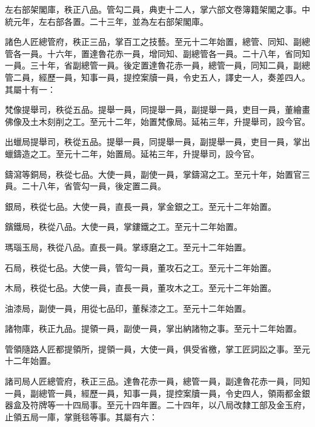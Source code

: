 \begin{pinyinscope}
 左右部架閣庫，秩正八品。管勾二員，典吏十二人，掌六部文卷簿籍架閣之事。中統元年，左右部各置。二十三年，並為左右部架閣庫。



 諸色人匠總管府，秩正三品，掌百工之技藝。至元十二年始置，總管、同知、副總管各一員。十六年，置達魯花赤一員，增同知、副總管各一員。二十八年，省同知一員。三十年，省副總管一員。後定置達魯花赤一員，總管一員，同知二員，副總管二員，經歷一員，知事一員，提控案牘一員，令史五人，譯史一人，奏差四人。其屬十有一：



 梵像提舉司，秩從五品。提舉一員，同提舉一員，副提舉一員，吏目一員，董繪畫佛像及土木刻削之工。至元十二年，始置梵像局。延祐三年，升提舉司，設今官。



 出蠟局提舉司，秩從五品。提舉一員，同提舉一員，副提舉一員，吏目一員，掌出蠟鑄造之工。至元十二年，始置局。延祐三年，升提舉司，設今官。



 鑄瀉等銅局，秩從七品。大使一員，副使一員，掌鑄瀉之工。至元十年，始置官三員。二十八年，省管勾一員，後定置二員。



 銀局，秩從七品。大使一員，直長一員，掌金銀之工。至元十二年始置。



 鑌鐵局，秩從八品。大使一員，掌鏤鐵之工。至元十二年始置。



 瑪瑙玉局，秩從八品。直長一員。掌琢磨之工。至元十二年始置。



 石局，秩從七品。大使一員，管勾一員，董攻石之工。至元十二年始置。



 木局，秩從七品。大使一員，直長一員，董攻木之工。至元十二年始置。



 油漆局，副使一員，用從七品印，董髹漆之工。至元十二年始置。



 諸物庫，秩正九品。提領一員，副使一員，掌出納諸物之事。至元十二年始置。



 管領隨路人匠都提領所，提領一員，大使一員，俱受省檄，掌工匠詞訟之事。至元十二年始置。



 諸司局人匠總管府，秩正三品。達魯花赤一員，總管一員，副達魯花赤一員，同知一員，副總管一員，經歷一員，知事一員，提控案牘一員，令史四人，領兩都金銀器盒及符牌等一十四局事。至元十四年置。二十四年，以八局改隸工部及金玉府，止領五局一庫，掌氈毯等事。其屬有六：




\end{pinyinscope}
